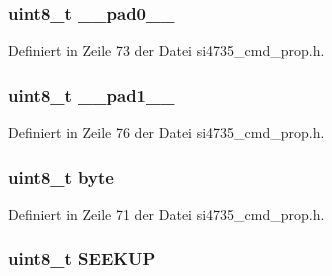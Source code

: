 \subsubsection[{\+\_\+\+\_\+pad0\+\_\+\+\_\+}]{\setlength{\rightskip}{0pt plus 5cm}uint8\+\_\+t \+\_\+\+\_\+pad0\+\_\+\+\_\+}\label{unionfm__seek__start__arg1_a8b4eebe79ded0459acec2f4950102ba3}


Definiert in Zeile 73 der Datei si4735\+\_\+cmd\+\_\+prop.\+h.

\hypertarget{unionfm__seek__start__arg1_a77f12d2e278bd5c07712648ac0df5e08}{}
\subsubsection[{\+\_\+\+\_\+pad1\+\_\+\+\_\+}]{\setlength{\rightskip}{0pt plus 5cm}uint8\+\_\+t \+\_\+\+\_\+pad1\+\_\+\+\_\+}\label{unionfm__seek__start__arg1_a77f12d2e278bd5c07712648ac0df5e08}


Definiert in Zeile 76 der Datei si4735\+\_\+cmd\+\_\+prop.\+h.

\hypertarget{unionfm__seek__start__arg1_a96f44d20f1dbf1c8785a7bc99a46164c}{}
\subsubsection[{byte}]{\setlength{\rightskip}{0pt plus 5cm}uint8\+\_\+t byte}\label{unionfm__seek__start__arg1_a96f44d20f1dbf1c8785a7bc99a46164c}


Definiert in Zeile 71 der Datei si4735\+\_\+cmd\+\_\+prop.\+h.

\hypertarget{unionfm__seek__start__arg1_a54afe228e11a8c6dabf9b5361f2054d8}{}
\subsubsection[{S\+E\+E\+K\+U\+P}]{\setlength{\rightskip}{0pt plus 5cm}uint8\+\_\+t S\+E\+E\+K\+U\+P}\label{unionfm__seek__start__arg1_a54afe228e11a8c6dabf9b5361f2054d8}


